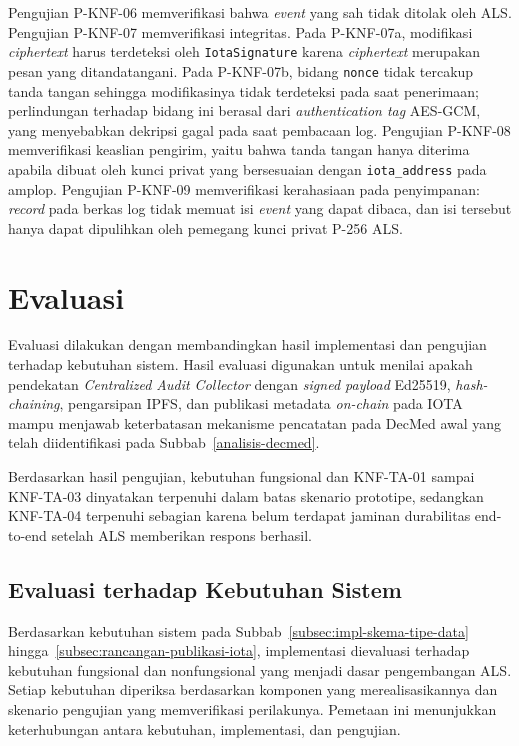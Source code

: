 Pengujian P-KNF-06 memverifikasi bahwa \textit{event} yang sah tidak ditolak
oleh ALS. Pengujian P-KNF-07 memverifikasi integritas. Pada P-KNF-07a,
modifikasi \textit{ciphertext} harus terdeteksi oleh \texttt{IotaSignature}
karena \textit{ciphertext} merupakan pesan yang ditandatangani. Pada P-KNF-07b,
bidang \texttt{nonce} tidak tercakup tanda tangan sehingga modifikasinya tidak
terdeteksi pada saat penerimaan; perlindungan terhadap bidang ini berasal dari
\textit{authentication tag} AES-GCM, yang menyebabkan dekripsi gagal pada saat
pembacaan log. Pengujian P-KNF-08 memverifikasi keaslian pengirim, yaitu bahwa
tanda tangan hanya diterima apabila dibuat oleh kunci privat yang bersesuaian
dengan \texttt{iota\_address} pada amplop. Pengujian P-KNF-09 memverifikasi
kerahasiaan pada penyimpanan: \textit{record} pada berkas log tidak memuat isi
\textit{event} yang dapat dibaca, dan isi tersebut hanya dapat dipulihkan oleh
pemegang kunci privat P-256 ALS.

\section{Evaluasi}
\label{sec:evaluasi}

Evaluasi dilakukan dengan membandingkan hasil implementasi dan pengujian terhadap kebutuhan sistem. Hasil evaluasi digunakan untuk menilai apakah pendekatan \textit{Centralized Audit Collector} dengan \textit{signed payload} Ed25519, \textit{hash-chaining}, pengarsipan IPFS, dan publikasi metadata \textit{on-chain} pada IOTA mampu menjawab keterbatasan mekanisme pencatatan pada DecMed awal yang telah diidentifikasi pada Subbab~\ref{analisis-decmed}.

Berdasarkan hasil pengujian, kebutuhan fungsional dan KNF-TA-01 sampai KNF-TA-03 dinyatakan terpenuhi dalam batas skenario prototipe, sedangkan KNF-TA-04 terpenuhi sebagian karena belum terdapat jaminan durabilitas end-to-end setelah ALS memberikan respons berhasil.

\subsection{Evaluasi terhadap Kebutuhan Sistem}
\label{subsec:evaluasi-kebutuhan}

Berdasarkan kebutuhan sistem pada Subbab~\ref{subsec:impl-skema-tipe-data} hingga~\ref{subsec:rancangan-publikasi-iota}, implementasi dievaluasi terhadap kebutuhan fungsional dan nonfungsional yang menjadi dasar pengembangan ALS. Setiap kebutuhan diperiksa berdasarkan komponen yang merealisasikannya dan skenario pengujian yang memverifikasi perilakunya. Pemetaan ini menunjukkan keterhubungan antara kebutuhan, implementasi, dan pengujian.

